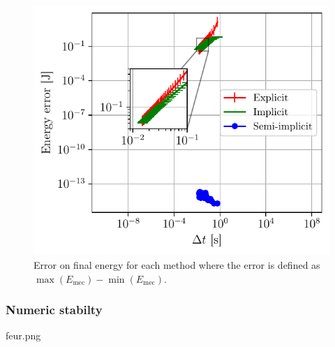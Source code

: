 \begin{figure}[h]
    \centering
    \includegraphics[width=0.8\linewidth]{figures/nograv_energy_error_all.pdf}
    \caption{Error on final energy for each method where the error is defined as $\max(E_\textrm{mec}) - \min(E_\textrm{mec}).$}
    \label{fig:nograv:energy_error}
\end{figure}

\subsubsection{Numeric stabilty}

feur.png

